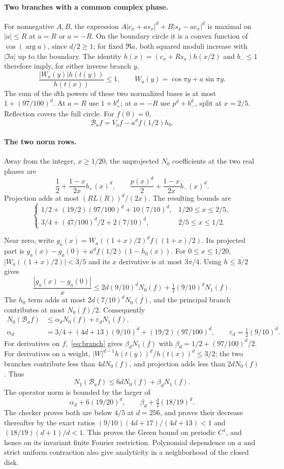\documentclass[11pt,a4paper]{article}
\theoremstyle{remark}\newtheorem*{ednote}{Editorial note (ProveIt, 2026-10-01)}
\begin{document}
\paragraph{Two branches with a common complex phase.}
For nonnegative $A,B$, the expression
$A|c_x+as_x|^d+B|s_x-ac_x|^d$ is maximal on $|a|\le R$ at $a=R$ or $a=-R$. On the boundary circle it is a convex function of $\cos(\arg a)$, since $d/2\ge1$; for fixed $\Re a$, both squared moduli increase with $|\Im a|$ up to the boundary. The identity
$h(x)=(c_x+Rs_x)h(x/2)$ and $b_-\le1$ therefore imply, for either inverse branch $y$,
\begin{equation}\label{eq:branch}
 \frac{|W_a(y)|h(t(y))}{h(t(x))}\le1,
 \qquad W_a(y)=\cos\pi y+a\sin\pi y.
\end{equation}
The sum of the $d$th powers of these two normalized bases is at most
$1+(97/100)^d$. At $a=R$ use $1+b_+^d$; at $a=-R$ use $p^d+b_-^d$, split at $x=2/5$. Reflection covers the full circle. For $f(0)=0$,
\[
 \mathcal B_af=V_af-a^df(1/2)h_0.
\]

\paragraph{The two norm rows.}
Away from the integer, $x\ge1/20$, the unprojected $N_0$ coefficients at the two real phases are
\[
 \frac12+\frac{1-x}{2x}b_+(x)^d,
 \qquad \frac{p(x)^d}{2}+\frac{1-x}{2x}b_-(x)^d.
\]
Projection adds at most $(RL(R))^d/(2x)$. The resulting bounds are
\[
 \begin{cases}
 1/2+(19/2)(97/100)^d+10(7/10)^d,&1/20\le x\le2/5,\\
 3/4+(47/100)^d/2+2(7/10)^d,&2/5\le x\le1/2.
 \end{cases}
\]

Near zero, write $g_a(x)=W_a((1+x)/2)^df((1+x)/2)$. Its projected part is
$g_a(x)-g_a(0)+a^df(1/2)(1-h_0(x))$.
For $0\le x\le1/20$, $|W_a((1+x)/2)|<3/5$ and its $x$ derivative is at most $3\pi/4$. Using $h\le3/2$ gives
\[
 \frac{|g_a(x)-g_a(0)|}{x}
 \le2d(9/10)^dN_0(f)+\tfrac12(9/10)^dN_1(f).
\]
The $h_0$ term adds at most $2d(7/10)^dN_0(f)$, and the principal branch contributes at most $N_0(f)/2$. Consequently
\begin{align*}
 N_0(\mathcal B_af)&\le\alpha_dN_0(f)+\varepsilon_dN_1(f),\\
 \alpha_d&=3/4+(4d+13)(9/10)^d+(19/2)(97/100)^d,\qquad
 \varepsilon_d=\tfrac12(9/10)^d.
\end{align*}
For derivatives on $f$,~\eqref{eq:branch} gives
$\beta_dN_1(f)$ with $\beta_d=1/2+(97/100)^d/2$.
For derivatives on a weight,
$|W|^{d-1}h(t(y))^d/h(t(x))^d\le3/2$;
the two branches contribute less than $4dN_0(f)$, and projection adds less than $2dN_0(f)$. Thus
\[
 N_1(\mathcal B_af)\le6dN_0(f)+\beta_dN_1(f).
\]
The operator norm is bounded by the larger of
\[
 \alpha_d+6(19/20)^d,\qquad
 \beta_d+\tfrac d2(18/19)^d.
\]
The checker proves both are below $4/5$ at $d=256$, and proves their decrease thereafter by the exact ratios
$(9/10)(4d+17)/(4d+13)<1$ and $(18/19)(d+1)/d<1$.
This proves the Green bound on periodic $C^1$, and hence on its invariant finite Fourier restriction. Polynomial dependence on $a$ and strict uniform contraction also give analyticity in a neighborhood of the closed disk.
\end{document}
